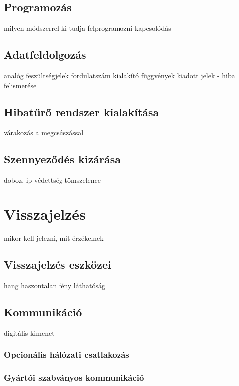 \subsection{Programozás}
milyen módszerrel
ki tudja felprogramozni
kapcsolódás
\subsection{Adatfeldolgozás}
analóg feszültségjelek
fordulatszám kialakító függvények
kiadott jelek - hiba felismerése
\subsection{Hibatűrő rendszer kialakítása}
várakozás a megcsúszással
\subsection{Szennyeződés kizárása}
doboz, ip védettség
tömszelence
\section{Visszajelzés}
mikor kell jelezni, mit érzékelnek
\subsection{Visszajelzés eszközei}
hang haszontalan
fény láthatóság
\subsection{Kommunikáció}
digitális kimenet

\subsubsection{Opcionális hálózati csatlakozás}

\subsubsection{Gyártói szabványos kommunikáció}
